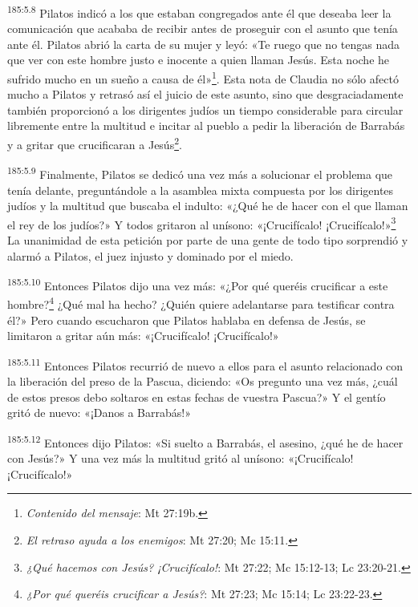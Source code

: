 \par 
\textsuperscript{185:5.8} Pilatos indicó a los que estaban congregados ante él que deseaba leer la comunicación que acababa de recibir antes de proseguir con el asunto que tenía ante él. Pilatos abrió la carta de su mujer y leyó: «Te ruego que no tengas nada que ver con este hombre justo e inocente a quien llaman Jesús. Esta noche he sufrido mucho en un sueño a causa de él»\footnote{\textit{Contenido del mensaje}: Mt 27:19b.}. Esta nota de Claudia no sólo afectó mucho a Pilatos y retrasó así el juicio de este asunto, sino que desgraciadamente también proporcionó a los dirigentes judíos un tiempo considerable para circular libremente entre la multitud e incitar al pueblo a pedir la liberación de Barrabás y a gritar que crucificaran a Jesús\footnote{\textit{El retraso ayuda a los enemigos}: Mt 27:20; Mc 15:11.}.

\par 
\textsuperscript{185:5.9} Finalmente, Pilatos se dedicó una vez más a solucionar el problema que tenía delante, preguntándole a la asamblea mixta compuesta por los dirigentes judíos y la multitud que buscaba el indulto: «¿Qué he de hacer con el que llaman el rey de los judíos?» Y todos gritaron al unísono: «¡Crucifícalo! ¡Crucifícalo!»\footnote{\textit{¿Qué hacemos con Jesús? ¡Crucifícalo!}: Mt 27:22; Mc 15:12-13; Lc 23:20-21.} La unanimidad de esta petición por parte de una gente de todo tipo sorprendió y alarmó a Pilatos, el juez injusto y dominado por el miedo.

\par 
\textsuperscript{185:5.10} Entonces Pilatos dijo una vez más: «¿Por qué queréis crucificar a este hombre?\footnote{\textit{¿Por qué queréis crucificar a Jesús?}: Mt 27:23; Mc 15:14; Lc 23:22-23.} ¿Qué mal ha hecho? ¿Quién quiere adelantarse para testificar contra él?» Pero cuando escucharon que Pilatos hablaba en defensa de Jesús, se limitaron a gritar aún más: «¡Crucifícalo! ¡Crucifícalo!»

\par 
\textsuperscript{185:5.11} Entonces Pilatos recurrió de nuevo a ellos para el asunto relacionado con la liberación del preso de la Pascua, diciendo: «Os pregunto una vez más, ¿cuál de estos presos debo soltaros en estas fechas de vuestra Pascua?» Y el gentío gritó de nuevo: «¡Danos a Barrabás!»

\par 
\textsuperscript{185:5.12} Entonces dijo Pilatos: «Si suelto a Barrabás, el asesino, ¿qué he de hacer con Jesús?» Y una vez más la multitud gritó al unísono: «¡Crucifícalo! ¡Crucifícalo!»

